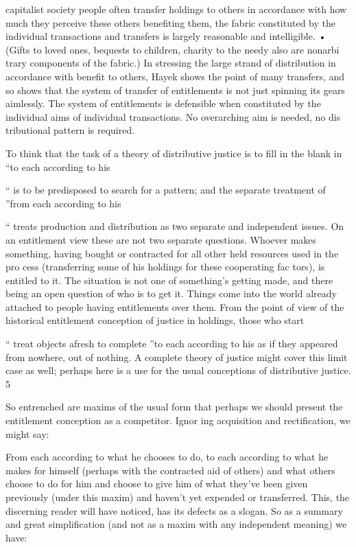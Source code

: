 \documentclass[11pt,openany]{book}
\begin{document}
capitalist society people often transfer holdings to others in accordance with how much they perceive these others benefiting them, the fabric constituted by the individual transactions and transfers is largely reasonable and intelligible. • (Gifts to loved ones, bequests to children, charity to the needy also are nonarbi trary components of the fabric.) In stressing the large strand of distribution in accordance with benefit to others, Hayek shows the point of many transfers, and so shows that the system of transfer of entitlements is not just spinning its gears aimlessly. The system of entitlements is defensible when constituted by the individual aims of individual transactions. No overarching aim is needed, no dis tributional pattern is required. 

To think that the task of a theory of distributive justice is to fill in the blank in ``to each according to his 

`` is to be predisposed to search for a pattern; and the separate treatment of ''from each according to his 

`` treats production and distribution as two separate and independent issues. On an entitlement view these are not two separate questions. Whoever makes something, having bought or contracted for all other held resources used in the pro cess (transferring some of his holdings for these cooperating fac tors), is entitled to it. The situation is not one of something's getting made, and there being an open question of who is to get it. Things come into the world already attached to people having entitlements over them. From the point of view of the historical entitlement conception of justice in holdings, those who start 

`` treat objects afresh to complete ''to each according to his as if they appeared from nowhere, out of nothing. A complete theory of justice might cover this limit case as well; perhaps here is a use for the usual conceptions of distributive justice. 5 

So entrenched are maxims of the usual form that perhaps we should present the entitlement conception as a competitor. Ignor ing acquisition and rectification, we might say: 

From each according to what he chooses to do, to each according to what he makes for himself (perhaps with the contracted aid of others) and what others choose to do for him and choose to give him of what they've been given previously (under this maxim) and haven't yet expended or transferred. This, the discerning reader will have noticed, has its defects as a slogan. So as a summary and great simplification (and not as a maxim with any independent meaning) we have: 
\end{document}
